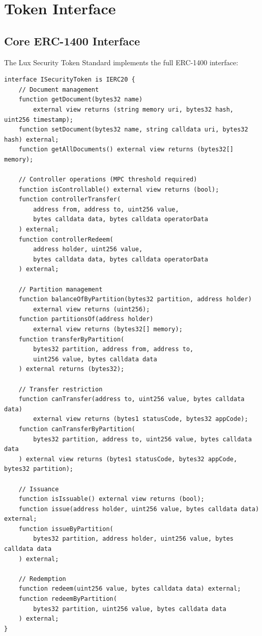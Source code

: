 \section{Token Interface}
\label{sec:interface}

\subsection{Core ERC-1400 Interface}

The Lux Security Token Standard implements the full ERC-1400 interface:

\begin{lstlisting}[language=Solidity,caption={Core security token interface.}]
interface ISecurityToken is IERC20 {
    // Document management
    function getDocument(bytes32 name)
        external view returns (string memory uri, bytes32 hash, uint256 timestamp);
    function setDocument(bytes32 name, string calldata uri, bytes32 hash) external;
    function getAllDocuments() external view returns (bytes32[] memory);

    // Controller operations (MPC threshold required)
    function isControllable() external view returns (bool);
    function controllerTransfer(
        address from, address to, uint256 value,
        bytes calldata data, bytes calldata operatorData
    ) external;
    function controllerRedeem(
        address holder, uint256 value,
        bytes calldata data, bytes calldata operatorData
    ) external;

    // Partition management
    function balanceOfByPartition(bytes32 partition, address holder)
        external view returns (uint256);
    function partitionsOf(address holder)
        external view returns (bytes32[] memory);
    function transferByPartition(
        bytes32 partition, address from, address to,
        uint256 value, bytes calldata data
    ) external returns (bytes32);

    // Transfer restriction
    function canTransfer(address to, uint256 value, bytes calldata data)
        external view returns (bytes1 statusCode, bytes32 appCode);
    function canTransferByPartition(
        bytes32 partition, address to, uint256 value, bytes calldata data
    ) external view returns (bytes1 statusCode, bytes32 appCode, bytes32 partition);

    // Issuance
    function isIssuable() external view returns (bool);
    function issue(address holder, uint256 value, bytes calldata data) external;
    function issueByPartition(
        bytes32 partition, address holder, uint256 value, bytes calldata data
    ) external;

    // Redemption
    function redeem(uint256 value, bytes calldata data) external;
    function redeemByPartition(
        bytes32 partition, uint256 value, bytes calldata data
    ) external;
}
\end{lstlisting}

